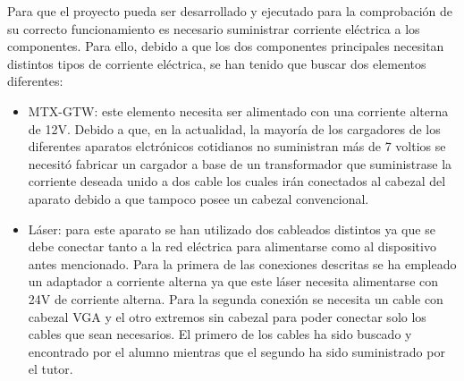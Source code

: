 Para que el proyecto pueda ser desarrollado y ejecutado para la comprobación de su correcto funcionamiento es necesario suministrar corriente eléctrica a los componentes. Para ello, debido a que los dos componentes principales necesitan distintos tipos de corriente eléctrica, se han tenido que buscar dos elementos diferentes:
\begin{itemize}
	\item MTX-GTW: este elemento necesita ser alimentado con una corriente alterna de 12V. Debido a que, en la actualidad, la mayoría de los cargadores de los diferentes aparatos elctrónicos cotidianos no suministran más de 7 voltios se necesitó fabricar un cargador a base de un transformador que suministrase la corriente deseada unido a dos cable los cuales irán conectados al cabezal del aparato debido a que tampoco posee un cabezal convencional.
	\item Láser: para este aparato se han utilizado dos cableados distintos ya que se debe conectar tanto a la red eléctrica para alimentarse como al dispositivo antes mencionado. Para la primera de las conexiones descritas se ha empleado un adaptador a corriente alterna ya que este láser necesita alimentarse con 24V de corriente alterna. Para la segunda conexión se necesita un cable con cabezal VGA y el otro extremos sin cabezal para poder conectar solo los cables que sean necesarios. El primero de los cables ha sido buscado y encontrado por el alumno mientras que el segundo ha sido suministrado por el tutor.
\end{itemize}